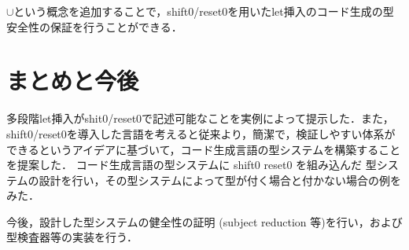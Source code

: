 \documentclass[10pt,a4j,twocolumn]{jarticle}
\theoremstyle{definition}
\begin{document}
$\cup$という概念を追加することで，shift0/reset0を用いたlet挿入のコード生成の型安全性の保証を行うことができる．

\section{まとめと今後}
多段階let挿入がshit0/reset0で記述可能なことを実例によって提示した．また，shift0/reset0を導入した言語を考えると従来より，簡潔で，検証しやすい体系ができるというアイデアに基づいて，コード生成言語の型システムを構築することを提案した．
コード生成言語の型システム\cite{Sudo2014}に shift0 reset0 を組み込んだ 型システムの設計を行い，その型システムによって型が付く場合と付かない場合の例をみた．

今後，設計した型システムの健全性の証明 (subject reduction 等)を行い，および型検査器等の実装を行う．



\end{document}
